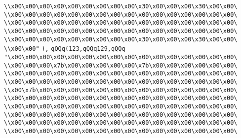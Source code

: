 \verb|\\x00\x00\x00\x00\x00\x00\x00\x00\x00\x30\x00\x00\x00\x30\x00\x00\|\newline
\verb|\\x00\x00\x00\x00\x00\x00\x00\x00\x00\x00\x00\x00\x00\x00\x00\x00\|\newline
\verb|\\x00\x00\x00\x00\x00\x00\x00\x00\x00\x00\x00\x00\x00\x00\x00\x00\|\newline
\verb|\\x00\x00\x00\x00\x00\x00\x00\x00\x00\x00\x00\x00\x00\x00\x00\x00\|\newline
\verb|\\x00\x00\x00\x00\x00\x00\x00\x00\x00\x30\x00\x00\x00\x30\x00\x00\|\newline
\verb|\\x00\x00"|\newline
\verb|),|\newline
\verb|qQQq(123,qQQq129,qQQq|\newline
\verb|"\x00\x00\x00\x00\x00\x00\x00\x00\x00\x00\x00\x00\x00\x00\x00\x00\|\newline
\verb|\\x00\x00\x00\x7b\x00\x00\x00\x00\x00\x7b\x00\x00\x00\x00\x00\x00\|\newline
\verb|\\x00\x00\x00\x00\x00\x00\x00\x00\x00\x00\x00\x00\x00\x00\x00\x00\|\newline
\verb|\\x00\x00\x00\x00\x00\x00\x00\x00\x00\x00\x00\x00\x00\x00\x00\x00\|\newline
\verb|\\x00\x7b\x00\x00\x00\x00\x00\x00\x00\x00\x00\x00\x00\x00\x00\x00\|\newline
\verb|\\x00\x00\x00\x00\x00\x00\x00\x00\x00\x00\x00\x00\x00\x00\x00\x00\|\newline
\verb|\\x00\x00\x00\x00\x00\x00\x00\x00\x00\x00\x00\x00\x00\x00\x00\x00\|\newline
\verb|\\x00\x00\x00\x00\x00\x00\x00\x00\x00\x00\x00\x00\x00\x00\x00\x00\|\newline
\verb|\\x00\x00\x00\x00\x00\x00\x00\x00\x00\x00\x00\x00\x00\x00\x00\x00\|\newline
\verb|\\x00\x00\x00\x00\x00\x00\x00\x00\x00\x00\x00\x00\x00\x00\x00\x00\|\newline
